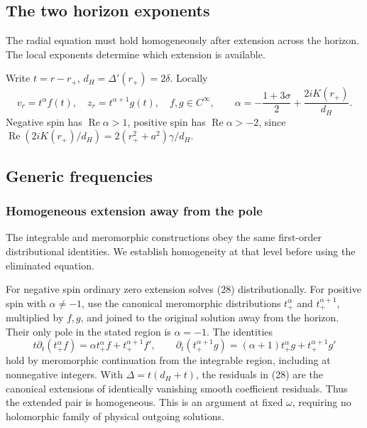 \documentclass[11pt,a4paper]{article}
\begin{document}
\subsection{The two horizon exponents}\label{readable-horizon-exponents}

The radial equation must hold homogeneously after extension across the horizon. The local exponents determine which extension is available.

Write \(t=r-r_+\), \(d_H=\Delta'(r_+)=2\delta\). Locally \[
 v_r=t^\alpha f(t),\quad z_r=t^{\alpha+1}g(t),\quad f,g\in C^\infty,
 \qquad
 \alpha=-\frac{1+3\sigma}{2}+\frac{2iK(r_+)}{d_H}.
 \tag{30}
\] Negative spin has \(\operatorname{Re}\alpha>1\), positive spin has
\(\operatorname{Re}\alpha>-2\), since
\(\operatorname{Re}(2iK(r_+)/d_H)=2(r_+^2+a^2)\gamma/d_H\).

\subsection{Generic frequencies}\label{generic-frequencies}

\subsubsection{Homogeneous extension away from the pole}\label{readable-generic-extension}

The integrable and meromorphic constructions obey the same first-order distributional identities. We establish homogeneity at that level before using the eliminated equation.

For negative spin ordinary zero extension solves (28) distributionally.
For positive spin with \(\alpha\ne-1\), use the canonical meromorphic
distributions \(t_+^\alpha\) and \(t_+^{\alpha+1}\), multiplied by
\(f,g\), and joined to the original solution away from the horizon.
Their only pole in the stated region is \(\alpha=-1\). The identities \[
 t\partial_t(t_+^\alpha f)
 =\alpha t_+^\alpha f+t_+^{\alpha+1}f',\qquad
 \partial_t(t_+^{\alpha+1}g)
 =(\alpha+1)t_+^\alpha g+t_+^{\alpha+1}g'
 \tag{31}
\] hold by meromorphic continuation from the integrable region,
including at nonnegative integers. With \(\Delta=t(d_H+t)\), the
residuals in (28) are the canonical extensions of identically vanishing
smooth coefficient residuals. Thus the extended pair is homogeneous.
This is an argument at fixed \(\omega\), requiring no holomorphic family
of physical outgoing solutions.
\end{document}

